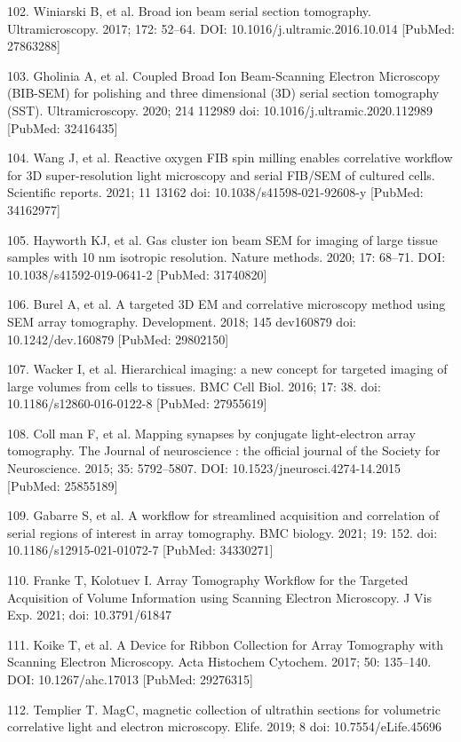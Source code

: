 \documentclass{article}
\begin{document}
\begin{hangpars}
102. Winiarski B, et al. Broad ion beam serial section tomography. Ultramicroscopy. 2017; 172: 52–64. DOI: 10.1016/j.ultramic.2016.10.014 [PubMed: 27863288]

103. Gholinia A, et al. Coupled Broad Ion Beam-Scanning Electron Microscopy (BIB-SEM) for polishing and three dimensional (3D) serial section tomography (SST). Ultramicroscopy. 2020; 214 112989 doi: 10.1016/j.ultramic.2020.112989 [PubMed: 32416435]

104. Wang J, et al. Reactive oxygen FIB spin milling enables correlative workflow for 3D super-resolution light microscopy and serial FIB/SEM of cultured cells. Scientific reports. 2021; 11 13162 doi: 10.1038/s41598-021-92608-y [PubMed: 34162977]

105. Hayworth KJ, et al. Gas cluster ion beam SEM for imaging of large tissue samples with 10 nm isotropic resolution. Nature methods. 2020; 17: 68–71. DOI: 10.1038/s41592-019-0641-2 [PubMed: 31740820]

106. Burel A, et al. A targeted 3D EM and correlative microscopy method using SEM array tomography. Development. 2018; 145 dev160879 doi: 10.1242/dev.160879 [PubMed: 29802150]

107. Wacker I, et al. Hierarchical imaging: a new concept for targeted imaging of large volumes from cells to tissues. BMC Cell Biol. 2016; 17: 38. doi: 10.1186/s12860-016-0122-8 [PubMed: 27955619]

108. Coll man F, et al. Mapping synapses by conjugate light-electron array tomography. The Journal of neuroscience : the official journal of the Society for Neuroscience. 2015; 35: 5792–5807. DOI: 10.1523/jneurosci.4274-14.2015 [PubMed: 25855189]

109. Gabarre S, et al. A workflow for streamlined acquisition and correlation of serial regions of interest in array tomography. BMC biology. 2021; 19: 152. doi: 10.1186/s12915-021-01072-7 [PubMed: 34330271]

110. Franke T, Kolotuev I. Array Tomography Workflow for the Targeted Acquisition of Volume Information using Scanning Electron Microscopy. J Vis Exp. 2021; doi: 10.3791/61847

111. Koike T, et al. A Device for Ribbon Collection for Array Tomography with Scanning Electron Microscopy. Acta Histochem Cytochem. 2017; 50: 135–140. DOI: 10.1267/ahc.17013 [PubMed: 29276315]

112. Templier T. MagC, magnetic collection of ultrathin sections for volumetric correlative light and electron microscopy. Elife. 2019; 8 doi: 10.7554/eLife.45696


\end{hangpars}
\end{document}
